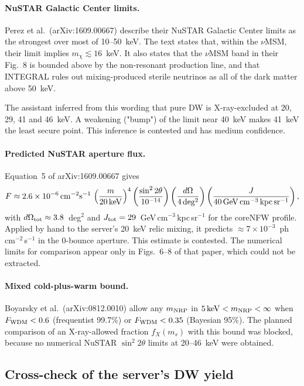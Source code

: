 \documentclass[11pt,a4paper]{article}
\begin{document}
\paragraph{NuSTAR Galactic Center limits.} Perez et al.\ (arXiv:1609.00667) describe their NuSTAR Galactic Center limits as the strongest over most of 10--50~keV. The text states that, within the $\nu$MSM, their limit implies $m_\chi\lesssim16$~keV. It also states that the $\nu$MSM band in their Fig.~8 is bounded above by the non-resonant production line, and that INTEGRAL rules out mixing-produced sterile neutrinos as all of the dark matter above 50~keV.

The assistant inferred from this wording that pure DW is X-ray-excluded at 20, 29, 41 and 46~keV. A weakening ("bump") of the limit near 40~keV makes 41~keV the least secure point. This inference is contested and has medium confidence.

\paragraph{Predicted NuSTAR aperture flux.} Equation~5 of arXiv:1609.00667 gives
\[
F\approx2.6\times10^{-6}\,{\rm cm^{-2}s^{-1}}\,\left(\frac{m}{20\,{\rm keV}}\right)^4\left(\frac{\sin^2 2\theta}{10^{-14}}\right)\left(\frac{d\Omega}{4\,{\rm deg^2}}\right)\left(\frac{J}{40\,{\rm GeV\,cm^{-3}\,kpc\,sr^{-1}}}\right),
\]
with $d\Omega_{\rm tot}\approx3.8$~deg$^2$ and $J_{\rm tot}=29$~GeV\,cm$^{-3}$\,kpc\,sr$^{-1}$ for the coreNFW profile. Applied by hand to the server's 20~keV relic mixing, it predicts $\approx7\times10^{-3}$~ph\,cm$^{-2}$\,s$^{-1}$ in the 0-bounce aperture. This estimate is contested. The numerical limits for comparison appear only in Figs.~6--8 of that paper, which could not be extracted.

\paragraph{Mixed cold-plus-warm bound.} Boyarsky et al.\ (arXiv:0812.0010) allow any $m_{\rm NRP}$ in $5\,{\rm keV}<m_{\rm NRP}<\infty$ when $F_{\rm WDM}<0.6$ (frequentist 99.7\%) or $F_{\rm WDM}<0.35$ (Bayesian 95\%). The planned comparison of an X-ray-allowed fraction $f_X(m_s)$ with this bound was blocked, because no numerical NuSTAR $\sin^2 2\theta$ limits at 20--46~keV were obtained.

\subsection{Cross-check of the server's DW yield}
\end{document}
